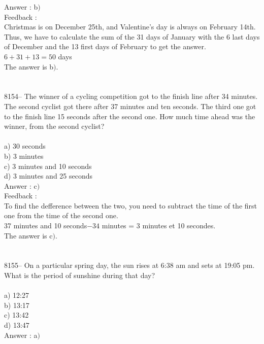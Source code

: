 \documentclass[letterpaper, 12pt]{article}
\begin{document}
Answer : b$)$\\

Feedback :\\
Christmas is on December 25th, and Valentine's day is always on February 14th. Thus, we have to calculate the sum of the 31 days of January with the 6 last days of December and the 13 first days of February to get the answer.\\
$6+31+13=50$ days\\
The answer is b$)$.\\
\\
\\
8154-- The winner of a cycling competition got to the finish line after 34 minutes. The second cyclist got there after 37 minutes and ten seconds. The third one got to the finish line 15 seconds after the second one. How much time ahead was the winner, from the second cyclist?\\
\\
a) 30 seconds\\
b) 3 minutes\\
c) 3 minutes and 10 seconds\\
d) 3 minutes and 25 seconds\\

Answer : c$)$\\

Feedback :\\
To find the defference between the two, you need to subtract the time of the first one from the time of the second one.\\
37 minutes and 10 seconds$-34$ minutes = 3 minutes et 10 secondes.\\
The answer is c$)$.\\
\\
\\
8155-- On a particular spring day, the sun rises at 6:38 am and sets at 19:05 pm. What is the period of sunshine during that day?\\
\\
a) 12:27\\
b) 13:17\\
c) 13:42\\
d) 13:47\\

Answer : a$)$\\
\end{document}
